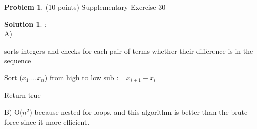 \documentclass{article}
\theoremstyle{definition}
\newtheorem{problem}{Problem}
\newtheorem*{solution}{Solution}
\begin{document}
\begin{problem} (10 points) Supplementary Exercise 30
\end{problem}
\begin{solution}:
\\
A)
\\

\begin{algorithm}
\caption{sorts integers and checks for each pair of terms whether their difference is in the sequence}
\label{}
\begin{algorithmic}[1]
    \State Sort ($x_1....x_n$) from high to low 
    	sub := $x_{i+1} - x_i$
	
        Return true
        \EndIf
	\EndFor
	\EndFor	
\EndProcedure
\end{algorithmic}
\end{algorithm}
\bigskip

B) O($n^2$) because nested for loops, and this algorithm is better than the brute force since it more efficient.
\end{solution}

\newpage
\end{document}
